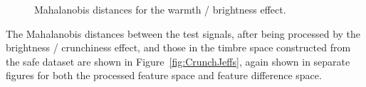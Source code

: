 			\begin{figure}[h!]
				\centering
				\quad
				\caption{Mahalanobis distances for the warmth / brightness effect.}
				\label{fig:HarshJeffs}
			\end{figure}

			The Mahalanobis distances between the test signals, after being processed by the brightness /
			crunchiness effect, and those in the timbre space constructed from the \acrshort{safe} dataset are
			shown in Figure~\ref{fig:CrunchJeffs}, again shown in separate figures for both the processed
			feature space and feature difference space.

